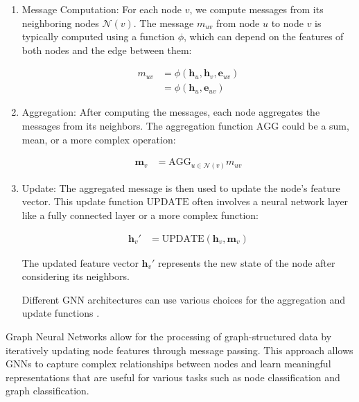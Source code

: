 \begin{enumerate}

\item Message Computation:
  For each node \( v \), we compute messages from its neighboring nodes \( \mathcal{N}(v) \).
  The message \( m_{uv} \) from node \( u \) to node \( v \) is typically computed using a function \( \phi \), which can depend on the features of both nodes and the edge between them:

  \begin{align}
    m_{uv} &= \phi(\mathbf{h}_u, \mathbf{h}_v, \mathbf{e}_{uv}) \\
           &= \phi(\mathbf{h}_u, \mathbf{e}_{uv})
  \end{align}

\item Aggregation:
  After computing the messages, each node aggregates the messages from its neighbors.
  The aggregation function \( \text{AGG} \) could be a sum, mean, or a more complex operation:

  \begin{align}
    \mathbf{m}_v &= \text{AGG}_{u \in \mathcal{N}(v)} m_{uv}
  \end{align}

\item Update:
  The aggregated message is then used to update the node’s feature vector.
  This update function \( \text{UPDATE} \) often involves a neural network layer like a fully connected layer or a more complex function:

  \begin{align}
    \mathbf{h}_v' &= \text{UPDATE}(\mathbf{h}_v, \mathbf{m}_v)
  \end{align}

  The updated feature vector \( \mathbf{h}_v' \) represents the new state of the node after considering its neighbors.

  Different GNN architectures can use various choices for the aggregation and update functions \cite{Micheli_2009}.

\end{enumerate}

Graph Neural Networks allow for the processing of graph-structured data by iteratively updating node features through message passing.
This approach allows GNNs to capture complex relationships between nodes and learn meaningful representations that are useful for various tasks such as node classification and graph classification.